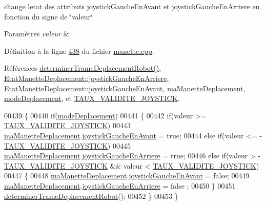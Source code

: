 change l\textquotesingle{}etat des attributs joystick\+Gauche\+En\+Avant et joystick\+Gauche\+En\+Arriere en fonction du signe de \char`\"{}valeur\char`\"{} 


\begin{DoxyParams}{Paramètres}
{\em valeur} & \\
\hline
\end{DoxyParams}


Définition à la ligne \hyperlink{manette_8cpp_source_l00438}{438} du fichier \hyperlink{manette_8cpp_source}{manette.\+cpp}.



Références \hyperlink{manette_8cpp_source_l00341}{determiner\+Trame\+Deplacement\+Robot()}, \hyperlink{manette_8h_source_l00181}{Etat\+Manette\+Deplacement\+::joystick\+Gauche\+En\+Arriere}, \hyperlink{manette_8h_source_l00180}{Etat\+Manette\+Deplacement\+::joystick\+Gauche\+En\+Avant}, \hyperlink{manette_8h_source_l00220}{ma\+Manette\+Deplacement}, \hyperlink{manette_8h_source_l00253}{mode\+Deplacement}, et \hyperlink{manette_8h_source_l00020}{T\+A\+U\+X\+\_\+\+V\+A\+L\+I\+D\+I\+T\+E\+\_\+\+J\+O\+Y\+S\+T\+I\+CK}.


\begin{DoxyCode}
00439 \{
00440     \textcolor{keywordflow}{if}(\hyperlink{class_manette_a4dc6231c8cc65fac03f59d323fa9a038}{modeDeplacement})
00441     \{
00442         \textcolor{keywordflow}{if}(valeur >= \hyperlink{manette_8h_a1ae244fc787303cd46a9b684fb4b4056}{TAUX\_VALIDITE\_JOYSTICK})
00443             \hyperlink{class_manette_af3d0f304c4c33e02bdf34fc99aa4dbff}{maManetteDeplacement}.\hyperlink{struct_etat_manette_deplacement_a8c8e3ca694408bc6a6ced4e20b9da0be}{joystickGaucheEnAvant} = \textcolor{keyword}{true};
00444         \textcolor{keywordflow}{else} \textcolor{keywordflow}{if}(valeur <= -\hyperlink{manette_8h_a1ae244fc787303cd46a9b684fb4b4056}{TAUX\_VALIDITE\_JOYSTICK})
00445             \hyperlink{class_manette_af3d0f304c4c33e02bdf34fc99aa4dbff}{maManetteDeplacement}.\hyperlink{struct_etat_manette_deplacement_a584cf1538425c87588c5b96b79c8d482}{joystickGaucheEnArriere} = \textcolor{keyword}{true};
00446         \textcolor{keywordflow}{else} \textcolor{keywordflow}{if}(valeur > -\hyperlink{manette_8h_a1ae244fc787303cd46a9b684fb4b4056}{TAUX\_VALIDITE\_JOYSTICK} && valeur < 
      \hyperlink{manette_8h_a1ae244fc787303cd46a9b684fb4b4056}{TAUX\_VALIDITE\_JOYSTICK})
00447         \{
00448             \hyperlink{class_manette_af3d0f304c4c33e02bdf34fc99aa4dbff}{maManetteDeplacement}.\hyperlink{struct_etat_manette_deplacement_a8c8e3ca694408bc6a6ced4e20b9da0be}{joystickGaucheEnAvant} = \textcolor{keyword}{false};
00449             \hyperlink{class_manette_af3d0f304c4c33e02bdf34fc99aa4dbff}{maManetteDeplacement}.\hyperlink{struct_etat_manette_deplacement_a584cf1538425c87588c5b96b79c8d482}{joystickGaucheEnArriere} = \textcolor{keyword}{false}
      ;
00450         \}
00451         \hyperlink{class_manette_a97a50caac68954a229c7e9461e7f4232}{determinerTrameDeplacementRobot}();
00452     \}
00453 \}
\end{DoxyCode}
\mbox{\label{class_manette_aadf275d6bac238d48f8879d264bbc868}} 
